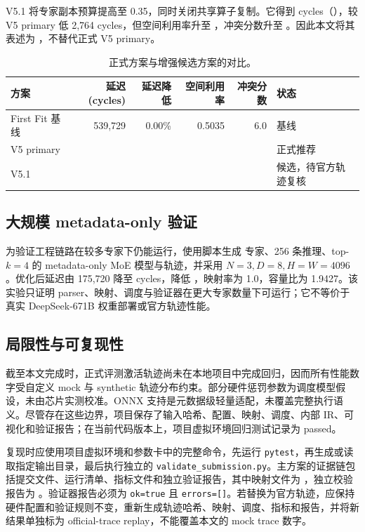 V5.1 将专家副本预算提高至 0.35，同时关闭共享算子复制。它得到 \CandidateLatency{} cycles（\CandidateImprovement{}），较 V5 primary 低 2,764 cycles，但空间利用率升至 \CandidateSpace{}，冲突分数升至 \CandidateConflict{}。因此本文将其表述为 \candidate{}，不替代正式 V5 primary。

\begin{table}[t]
\centering
\caption{正式方案与增强候选方案的对比。}
\label{tab:candidate}
\begin{tabular}{lrrrrl}
\toprule
方案 & 延迟(cycles) & 延迟降低 & 空间利用率 & 冲突分数 & 状态\\
\midrule
First Fit 基线 & 539,729 & 0.00\% & 0.5035 & 6.0 & 基线\\
V5 primary & \PrimaryLatency{} & \PrimaryImprovement{} & \PrimarySpace{} & \PrimaryConflict{} & 正式推荐\\
V5.1 & \CandidateLatency{} & \CandidateImprovement{} & \CandidateSpace{} & \CandidateConflict{} & 候选，待官方轨迹复核\\
\bottomrule
\end{tabular}
\end{table}

\subsection{大规模 metadata-only 验证}
为验证工程链路在较多专家下仍能运行，使用脚本生成 \LargeExperts{} 专家、256 条推理、top-$k=4$ 的 metadata-only MoE 模型与轨迹，并采用 $N=3,D=8,H=W=4096$。优化后延迟由 175,720 降至 \LargeLatency{} cycles，降低 \LargeImprovement{}，映射率为 1.0，容量比为 1.9427。该实验只证明 parser、映射、调度与验证器在更大专家数量下可运行；它不等价于真实 DeepSeek-671B 权重部署或官方轨迹性能。

\subsection{局限性与可复现性}
截至本文完成时，正式评测激活轨迹尚未在本地项目中完成回归，因而所有性能数字受自定义 mock 与 synthetic 轨迹分布约束。部分硬件惩罚参数为调度模型假设，未由芯片实测校准。ONNX 支持是元数据级轻量适配，未覆盖完整执行语义。尽管存在这些边界，项目保存了输入哈希、配置、映射、调度、内部 IR、可视化和验证报告；在当前代码版本上，项目虚拟环境回归测试记录为 \TestCount{} passed。

复现时应使用项目虚拟环境和参数卡中的完整命令，先运行 \texttt{pytest}，再生成或读取指定输出目录，最后执行独立的 \texttt{validate\_submission.py}。主方案的证据链包括提交文件、运行清单、指标文件和独立验证报告，其中映射文件为 ，独立校验报告为 。验证器报告必须为 \texttt{ok=true} 且 \texttt{errors=[]}。若替换为官方轨迹，应保持硬件配置和验证规则不变，重新生成轨迹哈希、映射、调度、指标和报告，并将新结果单独标为 official-trace replay，不能覆盖本文的 mock trace 数字。
